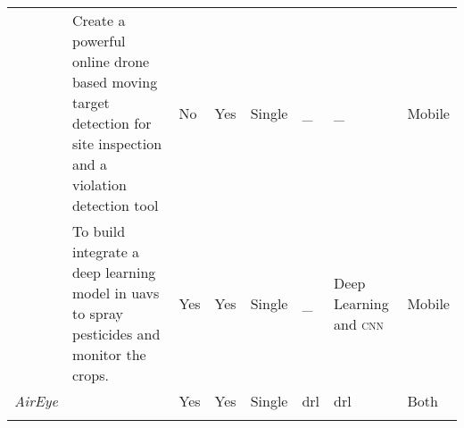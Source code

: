 {\begin{center}
\begin{footnotesize}
\begin{xltabular}{\textwidth}{ p{0.9cm} p{4cm} X X X X p{1.4cm} p{1.4cm} }
            \cite{Wang18} 
                & Create a powerful online drone 
                based moving target detection 
                for site inspection and 
                a violation detection tool 
                    & No 
                        & Yes 
            & Single 
                & \_
                    & \_
                        	& Mobile  \\ \addlinespace

            \cite{Khan21}
                & To build integrate a deep 
                learning model in \glspl{uav} to spray 
                pesticides and monitor the crops.
                    & Yes 
                        & Yes 
            & Single 
                & \_
                	& Deep Learning and \textsc{cnn}     
                        	& Mobile \\ \addlinespace

			\textit{AirEye} & \color{red}{description} 
				& Yes & Yes & Single & \gls{drl} & \gls{drl} & Both \\ \addlinespace
			
            \bottomrule
        \end{xltabular}
    \end{footnotesize}
\end{center}
}

